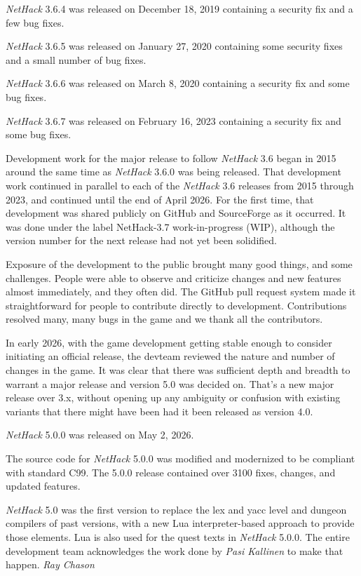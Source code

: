 \documentclass[titlepage]{article}
\begin{document}
\medskip
\textit{NetHack} 3.6.4 was released on December 18, 2019 containing a security fix and
a few bug fixes.

\medskip
\textit{NetHack} 3.6.5 was released on January 27, 2020 containing some security fixes
and a small number of bug fixes.

\medskip
\textit{NetHack} 3.6.6 was released on March 8, 2020 containing a security fix and
some bug fixes.

\medskip
\textit{NetHack} 3.6.7 was released on February 16, 2023 containing a security fix and
some bug fixes.

\medskip
Development work for the major release to follow \textit{NetHack} 3.6 began in 2015
around the same time as \textit{NetHack} 3.6.0 was being released. That development
work continued in parallel to each of the \textit{NetHack} 3.6 releases from 2015
through 2023, and continued until the end of April 2026.  For the first time,
that development was shared publicly on GitHub and SourceForge as it occurred.
It was done under the label NetHack-3.7 work-in-progress (WIP), although the
version number for the next release had not yet been solidified.

\medskip
Exposure of the development to the public brought many good things, and some
challenges. People were able to observe and criticize changes and new features
almost immediately, and they often did. The GitHub pull request system made
it straightforward for people to contribute directly to development.
Contributions resolved many, many bugs in the game and we thank all the
contributors.

\medskip
In early 2026, with the game development getting stable enough to consider
initiating an official release, the devteam reviewed the nature and number of
changes in the game. It was clear that there was sufficient depth and
breadth to warrant a major release and version 5.0 was decided on.
That's a new major release over 3.x, without opening up any ambiguity
or confusion with existing variants that there might have been had it
been released as version 4.0.

\medskip
\textit{NetHack} 5.0.0 was released on May 2, 2026.

\medskip
The source code for \textit{NetHack} 5.0.0 was modified and modernized to be
compliant with standard C99. The 5.0.0 release contained over 3100 fixes,
changes, and updated features.

\medskip
\textit{NetHack} 5.0 was the first version to replace the lex and yacc level
and dungeon compilers of past versions, with a new Lua interpreter-based
approach to provide those elements. Lua is also used for the quest texts
in \textit{NetHack} 5.0.0. The entire development team acknowledges the work
done by \textit{Pasi Kallinen} to make that happen.
\textit{Ray Chason}
\end{document}
